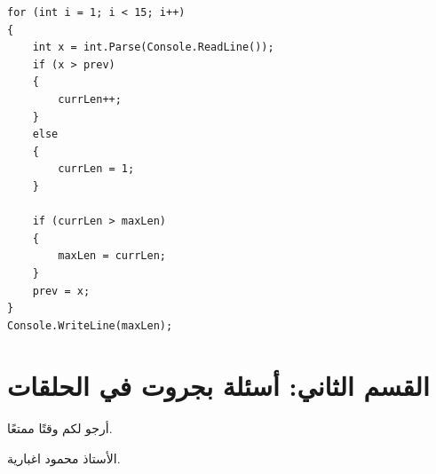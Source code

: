 \documentclass[14pt]{extarticle}
\begin{document}
\begin{enumerate}[itemsep=2em]
\begin{boxSolution}
\begin{english}
\begin{verbatim}
for (int i = 1; i < 15; i++)
{
    int x = int.Parse(Console.ReadLine());
    if (x > prev)
    {
        currLen++;
    }
    else
    {
        currLen = 1;
    }

    if (currLen > maxLen)
    {
        maxLen = currLen;
    }
    prev = x;
}
Console.WriteLine(maxLen);
\end{verbatim}
\end{english}
\end{boxSolution}
\fi
\filbreak

\end{enumerate}

\clearpage
\section*{القسم الثاني: أسئلة بجروت في الحلقات}













\vspace{1cm}
\begin{flushleft}
أرجو لكم وقتًا ممتعًا.

الأستاذ محمود اغبارية.
\end{flushleft}
\end{document}
